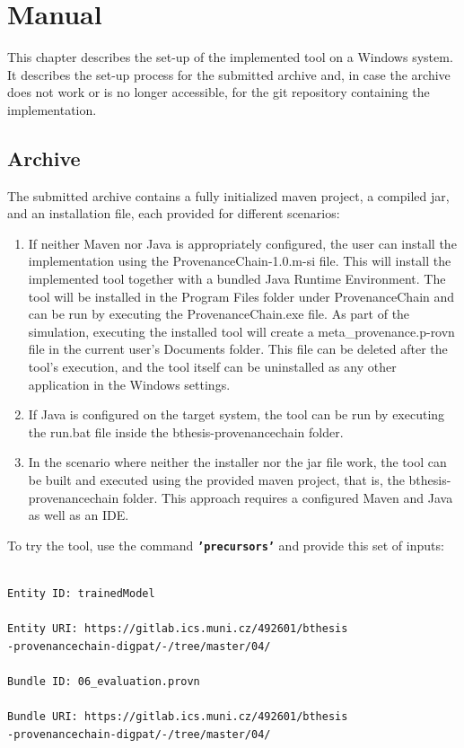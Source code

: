 \documentclass[
  digital,     %
  oneside,     %
  nosansbold,  %
  nocolorbold, %
  lof,         %
  lot,         %
]{fithesis4}
\begin{document}
\chapter{Manual}
\shorthandoff{-}
This chapter describes the set-up of the implemented tool on a Windows system. It describes the set-up process for the submitted archive and, in case the archive does not work or is no longer accessible, for the git repository containing the implementation.

\section{Archive}
The submitted archive contains a fully initialized maven project, a compiled jar, and an installation file, each provided for different scenarios:

\begin{enumerate}
    \item If neither Maven nor Java is appropriately configured, the user can install the implementation using the ProvenanceChain-1.0.m-si file. This will install the implemented tool together with a bundled Java Runtime Environment. The tool will be installed in the Program Files folder under ProvenanceChain and can be run by executing the ProvenanceChain.exe file. As part of the simulation, executing the installed tool will create a meta\_provenance.p-rovn file in the current user's Documents folder. This file can be deleted after the tool's execution, and the tool itself can be uninstalled as any other application in the Windows settings.
    \item If Java is configured on the target system, the tool can be run by executing the run.bat file inside the bthesis-provenancechain folder.
    \item In the scenario where neither the installer nor the jar file work, the tool can be built and executed using the provided maven project, that is, the bthesis-provenancechain folder. This approach requires a configured Maven and Java as well as an IDE.
\end{enumerate}

To try the tool, use the command \textbf{\texttt{'precursors'}} and provide this set of inputs: 
\begin{verbatim}

Entity ID: trainedModel

Entity URI: https://gitlab.ics.muni.cz/492601/bthesis
-provenancechain-digpat/-/tree/master/04/

Bundle ID: 06_evaluation.provn

Bundle URI: https://gitlab.ics.muni.cz/492601/bthesis
-provenancechain-digpat/-/tree/master/04/

\end{verbatim}
\end{document}

